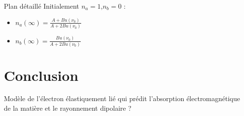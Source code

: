 \begin{reportBlock}{Plan détaillé}
Initialement $n_a=1$,$n_b=0$ : 
\begin{itemize}
    \item $n_a(\infty) = \frac{A + Bu(\nu_0)}{A + 2Bu(\nu_0)}$
    \item $n_b(\infty) = \frac{Bu(\nu_0)}{A + 2Bu(\nu_0)}$
\end{itemize}

\section*{Conclusion}
Modèle de l'électron élastiquement lié qui prédit l'absorption électromagnétique de la matière et le rayonnement dipolaire ?
\end{reportBlock}




